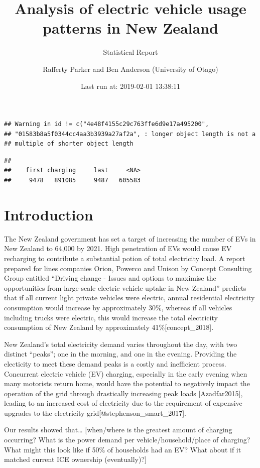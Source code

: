 \documentclass[]{article}
\title{Analysis of electric vehicle usage patterns in New Zealand}
\subtitle{Statistical Report}
\author{Rafferty Parker and Ben Anderson (University of Otago)}
\date{Last run at: 2019-02-01 13:38:11}
\begin{document}
\maketitle

{
\setcounter{tocdepth}{2}
\tableofcontents
}
\begin{verbatim}
## Warning in id != c("4e48f4155c29c763ffe6d9e17a495200",
## "01583b8a5f0344cc4aa3b3939a27af2a", : longer object length is not a
## multiple of shorter object length
\end{verbatim}

\begin{verbatim}
## 
##    first charging     last     <NA> 
##     9478   891085     9487   605583
\end{verbatim}

\section{Introduction}\label{introduction}

The New Zealand government has set a target of increasing the number of
EVs in New Zealand to 64,000 by 2021. High penetration of EVs would
cause EV recharging to contribute a substantial potion of total
electricity load. A report prepared for lines companies Orion, Powerco
and Unison by Concept Consulting Group entitled ``Driving change -
Issues and options to maximise the opportunities from large-scale
electric vehicle uptake in New Zealand'' predicts that if all current
light private vehicles were electric, annual residential electricity
consumption would increase by approximately 30\%, whereas if all
vehicles including trucks were electric, this would increase the total
electricity consumption of New Zealand by approximately
41\%{[}concept\_2018{]}.

New Zealand's total electricity demand varies throughout the day, with
two distinct ``peaks''; one in the morning, and one in the evening.
Providing the electicity to meet these demand peaks is a costly and
inefficient process. Concurrent electric vehicle (EV) charging,
especially in the early evening when many motorists return home, would
have the potential to negatively impact the operation of the grid
through drastically increasing peak loads {[}Azadfar2015{]}, leading to
an increased cost of electricity due to the requirement of expensive
upgrades to the electricity grid{[}@stephenson\_smart\_2017{]}.

Our results showed that\ldots{} {[}when/where is the greatest amount of
charging occurring? What is the power demand per vehicle/household/place
of charging? What might this look like if 50\% of households had an EV?
What about if it matched current ICE ownership (eventually)?{]}
\end{document}

